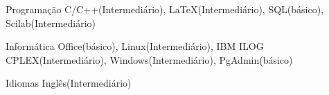 

\begin{cvskills}

  \cvskill
    {Programação} %
    {C/C++(Intermediário), LaTeX(Intermediário), SQL(básico), Scilab(Intermediário)} %

  \cvskill
    {Informática} %
    {Office(básico), Linux(Intermediário), IBM ILOG CPLEX(Intermediário), Windows(Intermediário), PgAdmin(básico)} %

  \cvskill
    {Idiomas} %
    {Inglês(Intermediário)} %

\end{cvskills}
